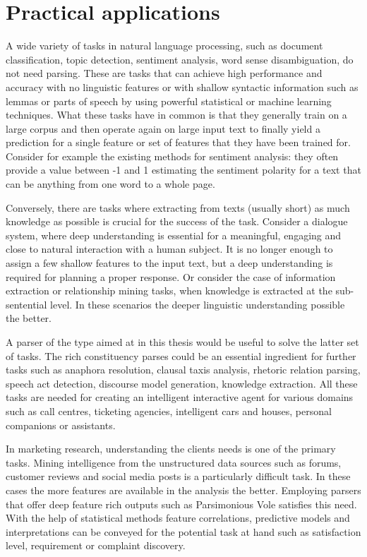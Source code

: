 \section{Practical applications}
    
    A wide variety of tasks in natural language processing, such as document classification, topic detection, sentiment analysis, word sense disambiguation, do not need parsing. These are tasks that can achieve high performance and accuracy with no linguistic features or with shallow syntactic information such as lemmas or parts of speech by using powerful statistical or machine learning techniques. What these tasks have in common is that they generally train on a large corpus and then operate again on large input text to finally yield a prediction for a single feature or set of features that they have been trained for. Consider for example the existing methods for sentiment analysis: they often provide a value between -1 and 1 estimating the sentiment polarity for a text that can be anything from one word to a whole page. 
 
    Conversely, there are tasks where extracting from texts (usually short) as much knowledge as possible is crucial for the success of the task. Consider a dialogue system, where deep understanding is essential for a meaningful, engaging and close to natural interaction with a human subject. It is no longer enough to assign a few shallow features to the input text, but a deep understanding is required for planning a proper response. Or consider the case of information extraction or relationship mining tasks, when knowledge is extracted at the sub-sentential level. In these scenarios the deeper linguistic understanding possible the better. 

    A parser of the type aimed at in this thesis would be useful to solve the latter set of tasks. The rich constituency parses could be an essential ingredient for further tasks such as anaphora resolution, clausal taxis analysis, rhetoric relation parsing, speech act detection, discourse model generation, knowledge extraction. All these tasks are needed for creating an intelligent interactive agent for various domains such as call centres, ticketing agencies, intelligent cars and houses, personal companions or assistants. 

    In marketing research, understanding the clients needs is one of the primary tasks. Mining intelligence from the unstructured data sources such as forums, customer reviews and social media posts is a particularly difficult task. In these cases the more features are available in the analysis the better. Employing parsers that offer deep feature rich outputs such as Parsimonious Vole satisfies this need. With the help of statistical methods feature correlations, predictive models and interpretations can be conveyed for the potential task at hand such as satisfaction level, requirement or complaint discovery.
    
